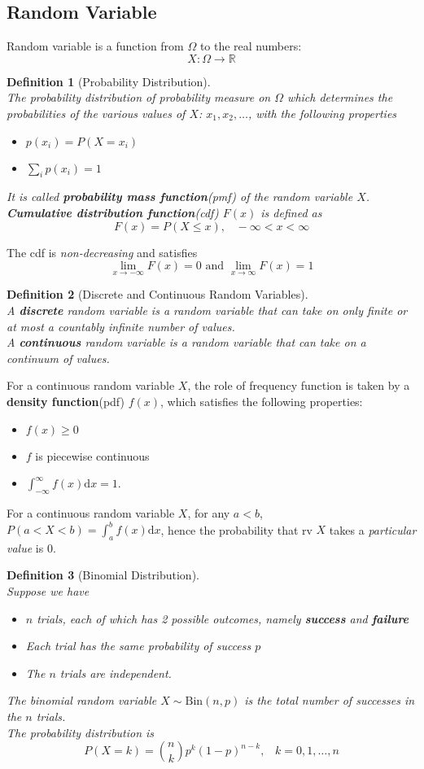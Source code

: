 \documentclass[12pt]{article}
\newcommand{\diff}{\mathrm{d}}
\newcommand{\bin}{\mathrm{Bin}}
\newtheorem{definition}{Definition}[section]
\theoremstyle{definition}
\begin{document}
\subsection{Random Variable}
Random variable is a function from $\Omega$ to the real numbers:
\[
X: \Omega \to \mathbb{R}
\]
\begin{definition}[Probability Distribution]
\hfill\\\normalfont The probability distribution of probability measure on $\Omega$ which determines the probabilities of the various values of $X$: $x_1, x_2,\ldots$, with the following properties
\begin{itemize}
  \item $p(x_i)=P(X=x_i)$
  \item $\sum_{i} p(x_i)=1$
\end{itemize}
It is called \textbf{probability mass function}(pmf) of the random variable $X$.\\
\textbf{Cumulative distribution function}(cdf) $F(x)$ is defined as 
\[
F(x) = P(X\leq x), \;\;\;-\infty<x<\infty
\]
\end{definition}
The cdf is \textit{non-decreasing} and satisfies
\[
\lim_{x\to -\infty} F(x)=0\text{   and   }\lim_{x\to \infty} F(x)=1
\]
\begin{definition}[Discrete and Continuous Random Variables]
\hfill\\\normalfont A \textbf{discrete} random variable is a random variable that can take on only finite or at most a countably infinite number of values.\\
A \textbf{continuous} random variable is a random variable that can take on a continuum of values.
\end{definition}
For a continuous random variable $X$, the role of frequency function is taken by a \textbf{density function}(pdf) $f(x)$, which satisfies the following properties:
\begin{itemize}
  \item $f(x)\geq 0$
  \item $f$ is piecewise continuous
  \item $\int_{-\infty}^{\infty} f(x)\diff x=1$.
\end{itemize}
For a continuous random variable $X$, for any $a<b$, $P(a<X<b)=\int_a^b f(x)\diff x$, hence the probability that rv $X$ takes a \textit{particular value} is $0$.
\begin{definition}[Binomial Distribution]
\hfill\\\normalfont Suppose we have
\begin{itemize}
  \item $n$ trials, each of which has 2 possible outcomes, namely \textbf{success} and \textbf{failure}
  \item Each trial has the same probability of success $p$
  \item The $n$ trials are independent.
\end{itemize}
The binomial random variable $X\sim \bin(n,p)$ is the total number of successes in the $n$ trials. \\
The probability distribution is
\[
P(X=k)=\binom{n}{k} p^k(1-p)^{n-k},\;\;\;k=0,1,\ldots, n
\]
\end{definition}
\end{document}
